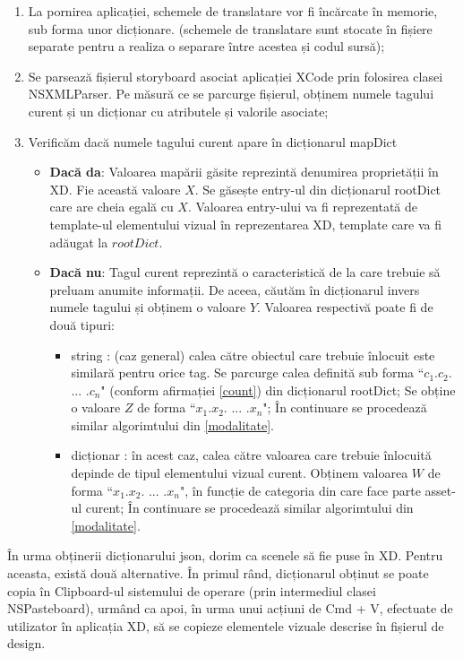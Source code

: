 \begin{enumerate}
\item La pornirea aplicației, schemele de translatare vor fi încărcate în memorie, sub forma unor dicționare. (schemele de translatare sunt stocate în fișiere separate pentru a realiza o separare între acestea și codul sursă);
\item Se parsează fișierul storyboard asociat aplicației XCode prin folosirea clasei NSXMLParser. Pe măsură ce se parcurge fișierul, obținem numele tagului curent și un dicționar cu atributele și valorile asociate;
\item Verificăm dacă numele tagului curent apare în dicționarul mapDict
\begin{itemize}
\item \textbf{Dacă da}: Valoarea mapării găsite reprezintă denumirea proprietății în XD. Fie această valoare $X$. Se găsește entry-ul din dicționarul rootDict care are cheia egală cu $X$. Valoarea entry-ului va fi reprezentată de template-ul elementului vizual în reprezentarea XD, template care va fi adăugat la $rootDict$.
\item \textbf{Dacă nu}: Tagul curent reprezintă o caracteristică de la care trebuie să preluam anumite informații. De aceea, căutăm în dicționarul invers numele tagului și obținem o valoare $Y$. Valoarea respectivă poate fi de două tipuri:
\begin{itemize}
\item string : (caz general) calea către obiectul care trebuie înlocuit este similară pentru orice tag. Se parcurge calea definită sub forma ``$c_1$.$c_2$. ... .$c_n$" (conform afirmației \ref{count}) din dicționarul rootDict; Se obține o valoare $Z$ de forma ``$x_1$.$x_2$. ... .$x_n$"; În continuare se procedează similar algorimtului din \ref{modalitate}.
\item dicționar : în acest caz, calea către valoarea care trebuie înlocuită depinde de tipul elementului vizual curent. Obținem valoarea $W$ de forma ``$x_1$.$x_2$. ... .$x_n$", în funcție de categoria din care face parte asset-ul curent; În continuare se procedează similar algorimtului din \ref{modalitate}.
\end{itemize}
\end{itemize}
\end{enumerate}

În urma obținerii dicționarului json, dorim ca scenele să fie puse în XD. Pentru aceasta, există două alternative. În primul rând, dicționarul obținut se poate copia în Clipboard-ul sistemului de operare (prin intermediul clasei NSPasteboard), urmând ca apoi, în urma unui acțiuni de Cmd + V, efectuate de utilizator în aplicația XD, să se copieze elementele vizuale descrise în fișierul de design.

